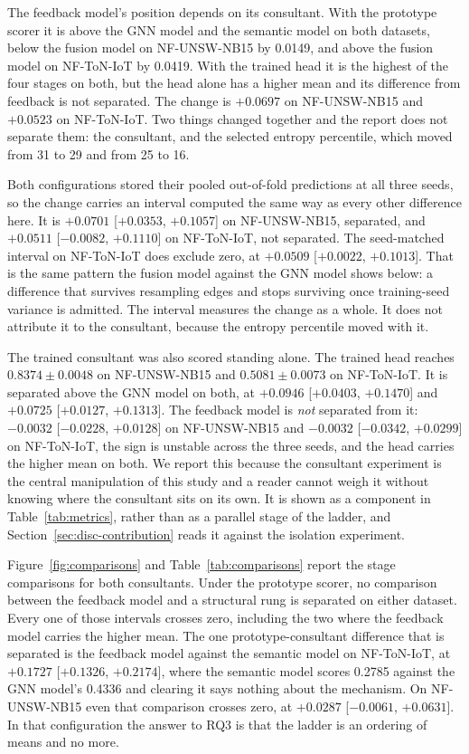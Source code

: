 The feedback model's position depends on its consultant. With the prototype scorer it is above the GNN model and the semantic model on both datasets, below the fusion model on NF-UNSW-NB15 by 0.0149, and above
the fusion model on NF-ToN-IoT by 0.0419. With the trained head it is the highest of the four stages on both, but the head alone has a higher mean and its difference from feedback is not separated. The change
is $+0.0697$ on NF-UNSW-NB15 and $+0.0523$ on NF-ToN-IoT. Two things changed together and the
report does not separate them: the consultant, and the selected entropy percentile, which moved
from 31 to 29 and from 25 to 16.

Both configurations stored their pooled out-of-fold predictions at all three seeds, so the
change carries an interval computed the same way as every other difference here. It is
$+0.0701$ [$+0.0353$, $+0.1057$] on NF-UNSW-NB15, separated, and $+0.0511$ [$-0.0082$,
$+0.1110$] on NF-ToN-IoT, not separated. The seed-matched interval on NF-ToN-IoT does exclude
zero, at $+0.0509$ [$+0.0022$, $+0.1013$]. That is the same pattern the fusion model against the GNN model shows below: a difference that survives resampling edges and stops surviving once
training-seed variance is admitted. The
interval measures the change as a whole. It does not attribute it to the consultant, because
the entropy percentile moved with it.

The trained consultant was also scored standing alone. The
trained head reaches $0.8374 \pm 0.0048$ on NF-UNSW-NB15 and $0.5081 \pm 0.0073$ on NF-ToN-IoT.
It is separated above the GNN model on both, at $+0.0946$ [$+0.0403$, $+0.1470$] and $+0.0725$
[$+0.0127$, $+0.1313$]. The feedback model is \emph{not} separated from it: $-0.0032$
[$-0.0228$, $+0.0128$] on NF-UNSW-NB15 and $-0.0032$ [$-0.0342$, $+0.0299$] on NF-ToN-IoT, the
sign is unstable across the three seeds, and the head carries the higher mean on both. We report
this because the consultant experiment is the central manipulation of this study and a reader
cannot weigh it without knowing where the consultant sits on its own. It is shown as a component in Table~\ref{tab:metrics}, rather than as a parallel stage of the ladder, and Section~\ref{sec:disc-contribution} reads it against the isolation experiment.

Figure~\ref{fig:comparisons} and Table~\ref{tab:comparisons} report the stage comparisons for both consultants. Under the
prototype scorer, no comparison between the feedback model and a structural rung is separated on
either dataset. Every one of those intervals crosses zero, including the two where the feedback
model carries the higher mean. The one prototype-consultant difference that is separated is the
feedback model against the semantic model on NF-ToN-IoT, at $+0.1727$ [$+0.1326$, $+0.2174$],
where the semantic model scores 0.2785 against the GNN model's 0.4336 and clearing it says
nothing about the mechanism. On NF-UNSW-NB15 even that comparison crosses zero, at $+0.0287$
[$-0.0061$, $+0.0631$]. In that configuration the answer to RQ3 is that the ladder is an
ordering of means and no more.

